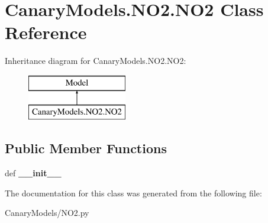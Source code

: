 \hypertarget{class_canary_models_1_1_n_o2_1_1_n_o2}{\section{Canary\-Models.\-N\-O2.\-N\-O2 Class Reference}
\label{class_canary_models_1_1_n_o2_1_1_n_o2}
}
Inheritance diagram for Canary\-Models.\-N\-O2.\-N\-O2\-:\begin{figure}[H]
\begin{center}
\leavevmode
\includegraphics[height=2.000000cm]{class_canary_models_1_1_n_o2_1_1_n_o2}
\end{center}
\end{figure}
\subsection*{Public Member Functions}
\begin{DoxyCompactItemize}
\item 
\hypertarget{class_canary_models_1_1_n_o2_1_1_n_o2_ab72bcacce114176601574215f6143090}{def {\bfseries \-\_\-\-\_\-init\-\_\-\-\_\-}}\label{class_canary_models_1_1_n_o2_1_1_n_o2_ab72bcacce114176601574215f6143090}

\end{DoxyCompactItemize}


The documentation for this class was generated from the following file\-:\begin{DoxyCompactItemize}
\item 
Canary\-Models/N\-O2.\-py\end{DoxyCompactItemize}
